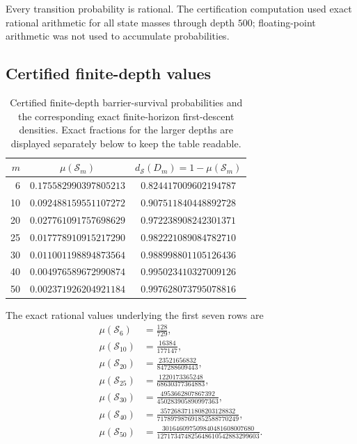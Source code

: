 \documentclass[11pt]{article}
\theoremstyle{definition}
\theoremstyle{remark}
\newcommand{\Sset}{\mathcal S}
\newcommand{\ds}{d_{\Sset}}
\begin{document}
Every transition probability is rational.  The certification computation used exact rational arithmetic for all state masses through depth $500$; floating-point arithmetic was not used to accumulate probabilities.

\subsection{Certified finite-depth values}

\begin{table}[ht]
\centering
\caption{Certified finite-depth barrier-survival probabilities and the corresponding exact finite-horizon first-descent densities.  Exact fractions for the larger depths are displayed separately below to keep the table readable.}
\label{tab:dp}
\small
\begin{tabular}{rcc}
\toprule
$m$ & $\mu(\mathcal S_m)$ & $\ds(D_m)=1-\mu(\mathcal S_m)$\\
\midrule
6  & $0.175582990397805213$ & $0.824417009602194787$\\
10 & $0.092488159551107272$ & $0.907511840448892728$\\
20 & $0.027761091757698629$ & $0.972238908242301371$\\
25 & $0.017778910915217290$ & $0.982221089084782710$\\
30 & $0.011001198894873564$ & $0.988998801105126436$\\
40 & $0.004976589672990874$ & $0.995023410327009126$\\
50 & $0.002371926204921184$ & $0.997628073795078816$\\
\bottomrule
\end{tabular}
\end{table}

The exact rational values underlying the first seven rows are
\begin{align*}
\mu(\mathcal S_6)&=\frac{128}{729},\\
\mu(\mathcal S_{10})&=\frac{16384}{177147},\\
\mu(\mathcal S_{20})&=\frac{23521656832}{847288609443},\\
\mu(\mathcal S_{25})&=\frac{1220173365248}{68630377364883},\\
\mu(\mathcal S_{30})&=\frac{4953662807867392}{450283905890997363},\\
\mu(\mathcal S_{40})&=\frac{3572683711808203128832}{717897987691852588770249},\\
\mu(\mathcal S_{50})&=
\frac{301646097509840481608007680}
{127173474825648610542883299603}.
\end{align*}
\end{document}
